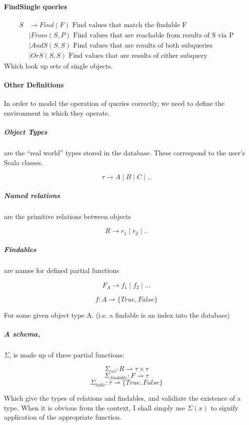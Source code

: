 \documentclass[12pt,a4paper,twoside,openright]{report}
\begin{document}
\paragraph{FindSingle queries}
\begin{equation}
\label{SDefinition}
\begin{split}
S & \rightarrow Find(F) \mbox{ Find values that match the findable F}\\
&\mid From(S, P) \mbox{ Find values that are reachable from results of S via P}\\
&\mid AndS(S, S) \mbox{ Find values that are results of both subqueries}\\
&\mid OrS(S, S) \mbox{ Find values that are results of either subquery}
\end{split}
\end{equation} 
Which look up sets of single objects.\\

\paragraph{Other Definitions}
In order to model the operation of queries correctly, we need to define the environment in which they operate.

\subparagraph{Object Types} are the ``real world'' types stored in the database. These correspond to the user's Scala classes.

\[ \tau \rightarrow A \mid B \mid C \mid .. \]

\subparagraph{Named relations} are the primitive relations between objects

\[R \rightarrow r_1 \mid r_2 \mid .. \]

\subparagraph{Findables} are names for defined partial functions

\[F_A \rightarrow f_1 \mid f_2 \mid ... \]

\[f \colon A \rightharpoonup \{True, False\} \]

For some given object type A. (i.e. a findable is an index into the database)

\subparagraph{A schema,}$\Sigma$, is made up of three partial functions:

\[\Sigma_{rel}\colon R \rightharpoonup \tau\times\tau \]
\[\Sigma_{findable}\colon F \rightharpoonup \tau \]
\[\Sigma_{table}\colon \tau \rightharpoonup \{True, False\} \]

Which give the types of relations and findables, and validiate the existence of a type. When it is obvious from the context, I shall simply use $\Sigma(x)$ to signify application of the appropriate function.
 
\end{document}
